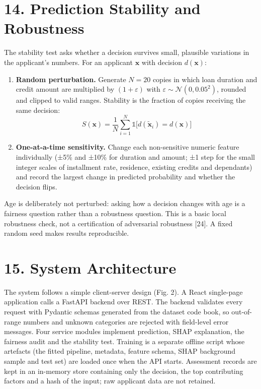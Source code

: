 \documentclass[
  11pt,
]{article}
\providecommand{\tightlist}{%
  \setlength{\itemsep}{0pt}\setlength{\parskip}{0pt}}
\begin{document}
\hypertarget{prediction-stability-and-robustness}{%
\section{14. Prediction Stability and
Robustness}\label{prediction-stability-and-robustness}}

The stability test asks whether a decision survives small, plausible
variations in the applicant's numbers. For an applicant \(\mathbf{x}\)
with decision \(d(\mathbf{x})\):

\begin{enumerate}
\def\labelenumi{\arabic{enumi}.}
\tightlist
\item
  \textbf{Random perturbation.} Generate \(N = 20\) copies in which loan
  duration and credit amount are multiplied by \((1+\varepsilon)\) with
  \(\varepsilon \sim \mathcal{N}(0, 0.05^2)\), rounded and clipped to
  valid ranges. Stability is the fraction of copies receiving the same
  decision:
  \[S(\mathbf{x}) = \frac{1}{N}\sum_{i=1}^{N} \mathbb{1}\big[d(\tilde{\mathbf{x}}_i) = d(\mathbf{x})\big]\]
\item
  \textbf{One-at-a-time sensitivity.} Change each non-sensitive numeric
  feature individually (±5\% and ±10\% for duration and amount; ±1 step
  for the small integer scales of installment rate, residence, existing
  credits and dependants) and record the largest change in predicted
  probability and whether the decision flips.
\end{enumerate}

Age is deliberately not perturbed: asking how a decision changes with
age is a fairness question rather than a robustness question. This is a
basic local robustness check, not a certification of adversarial
robustness {[}24{]}. A fixed random seed makes results reproducible.

\hypertarget{system-architecture}{%
\section{15. System Architecture}\label{system-architecture}}

The system follows a simple client-server design (Fig. 2). A React
single-page application calls a FastAPI backend over REST. The backend
validates every request with Pydantic schemas generated from the dataset
code book, so out-of-range numbers and unknown categories are rejected
with field-level error messages. Four service modules implement
prediction, SHAP explanation, the fairness audit and the stability test.
Training is a separate offline script whose artefacts (the fitted
pipeline, metadata, feature schema, SHAP background sample and test set)
are loaded once when the API starts. Assessment records are kept in an
in-memory store containing only the decision, the top contributing
factors and a hash of the input; raw applicant data are not retained.
\end{document}
